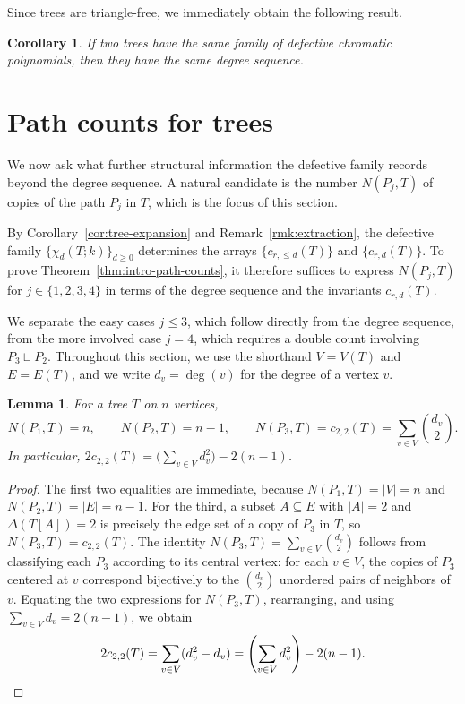 \documentclass[12pt,reqno]{amsart}
\newtheorem{lem}[thm]{Lemma}
\newtheorem{cor}[thm]{Corollary}
\theoremstyle{definition}
\begin{document}
Since trees are triangle-free, we immediately obtain the following result.

\begin{cor}\label{cor:trees-degree-sequence}
If two trees have the same family of defective chromatic polynomials, then they have the same degree sequence.
\end{cor}

\section{Path counts for trees}\label{sec:paths}

We now ask what further structural information the defective family records beyond the degree sequence. A natural candidate is the number $N(P_j,T)$ of copies of the path $P_j$ in $T$, which is the focus of this section.

By Corollary~\ref{cor:tree-expansion} and Remark~\ref{rmk:extraction}, the defective family $\{\chi_d(T;k)\}_{d\geq 0}$ determines the arrays $\{c_{r,\leq d}(T)\}$ and $\{c_{r,d}(T)\}$. To prove Theorem~\ref{thm:intro-path-counts}, it therefore suffices to express $N(P_j,T)$ for $j\in\{1,2,3,4\}$ in terms of the degree sequence and the invariants $c_{r,d}(T)$.

We separate the easy cases $j\leq 3$, which follow directly from the degree sequence, from the more involved case $j=4$, which requires a double count involving $P_3\sqcup P_2$. Throughout this section, we use the shorthand $V=V(T)$ and $E=E(T)$, and we write $d_v=\deg(v)$ for the degree of a vertex $v$.

\begin{lem}\label{lem:easy-path-counts}
For a tree $T$ on $n$ vertices,
\[
N(P_1, T) = n, \qquad N(P_2, T)= n-1, \qquad N(P_3, T) = c_{2,2}(T) = \sum_{v\in V} \binom{d_v}{2}.
\]
In particular, $2c_{2,2}(T)=\bigl(\sum_{v\in V} d_v^2\bigr)-2(n-1)$.
\end{lem}

\begin{proof}
The first two equalities are immediate, because $N(P_1,T)=|V|=n$ and $N(P_2,T)=|E|=n-1$. For the third, a subset $A\subseteq E$ with $|A|=2$ and $\Delta(T[A])=2$ is precisely the edge set of a copy of $P_3$ in $T$, so $N(P_3, T)=c_{2,2}(T)$. The identity $N(P_3,T)=\sum_{v\in V}\binom{d_v}{2}$ follows from classifying each $P_3$ according to its central vertex: for each $v\in V$, the copies of $P_3$ centered at $v$ correspond bijectively to the $\binom{d_v}{2}$ unordered pairs of neighbors of $v$. Equating the two expressions for $N(P_3, T)$, rearranging, and using $\sum_{v\in V}d_v=2(n-1)$, we obtain
\[
2c_{2,2}(T)=\sum_{v\in V}(d_v^2-d_v)=\left(\sum_{v\in V}d_v^2\right)-2(n-1). \qedhere
\]
\end{proof}
\end{document}
